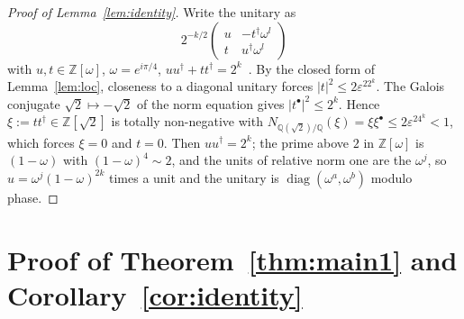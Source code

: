 \documentclass[aps,prx,twocolumn,superscriptaddress,nofootinbib,longbibliography]{revtex4-2}
\theoremstyle{plain}
\theoremstyle{definition}
\theoremstyle{remark}
\newcommand{\Z}{\mathbb{Z}}
\newcommand{\Q}{\mathbb{Q}}
\begin{document}
\begin{proof}[Proof of Lemma~\ref{lem:identity}]
Write the unitary as
\[2^{-k/2}\begin{pmatrix}u&-t^\dagger\omega^l\\ t&u^\dagger\omega^l\end{pmatrix}\]
with $u,t\in\Z[\omega]$, $\omega=e^{i\pi/4}$, $uu^\dagger+tt^\dagger=2^k$~\cite{KMM13}. By the closed form of Lemma~\ref{lem:loc}, closeness to a diagonal unitary forces $|t|^2\le2\varepsilon^22^k$. The Galois conjugate $\sqrt2\mapsto-\sqrt2$ of the norm equation gives $|t^\bullet|^2\le2^k$. Hence $\xi:=tt^\dagger\in\Z[\sqrt2]$ is totally non-negative with $N_{\Q(\sqrt2)/\Q}(\xi)=\xi\xi^\bullet\le2\varepsilon^24^k<1$, which forces $\xi=0$ and $t=0$. Then $uu^\dagger=2^k$; the prime above $2$ in $\Z[\omega]$ is $(1-\omega)$ with $(1-\omega)^4\sim2$, and the units of relative norm one are the $\omega^j$, so $u=\omega^j(1-\omega)^{2k}$ times a unit and the unitary is $\operatorname{diag}(\omega^a,\omega^b)$ modulo phase.
\end{proof}

\section{Proof of Theorem~\ref{thm:main1} and Corollary~\ref{cor:identity}}\label{app:main1}
\end{document}
